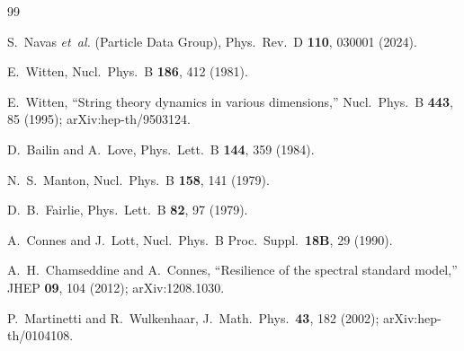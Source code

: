 \documentclass[aps,prd,onecolumn,superscriptaddress,nofootinbib,reprint]{revtex4-2}
\begin{document}
\begin{thebibliography}{99}

S.~Navas \emph{et~al.} (Particle Data Group), Phys.\ Rev.\ D
\textbf{110}, 030001 (2024).

E.~Witten, Nucl.\ Phys.\ B \textbf{186}, 412 (1981).

E.~Witten, ``String theory dynamics in various dimensions,'' Nucl.\ Phys.\
B \textbf{443}, 85 (1995); arXiv:hep-th/9503124.

D.~Bailin and A.~Love, Phys.\ Lett.\ B \textbf{144}, 359 (1984).

\bibitem{Manton1979}
N.~S.~Manton, Nucl.\ Phys.\ B \textbf{158}, 141 (1979).

D.~B.~Fairlie, Phys.\ Lett.\ B \textbf{82}, 97 (1979).

A.~Connes and J.~Lott, Nucl.\ Phys.\ B Proc.\ Suppl.\ \textbf{18B}, 29
(1990).

A.~H.~Chamseddine and A.~Connes, ``Resilience of the spectral standard
model,'' JHEP \textbf{09}, 104 (2012); arXiv:1208.1030.

P.~Martinetti and R.~Wulkenhaar, J.~Math.~Phys.~\textbf{43}, 182
(2002); arXiv:hep-th/0104108.


\end{thebibliography}
\end{document}
